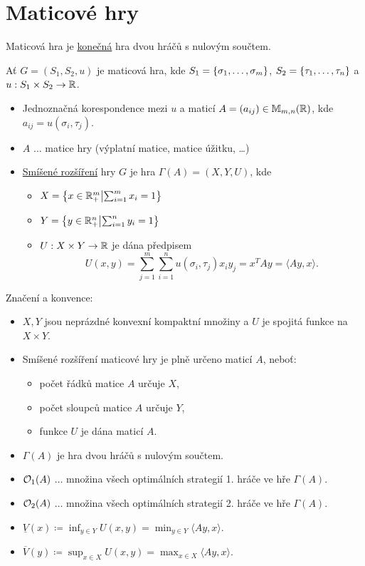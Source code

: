 \section{Maticové hry}
Maticová hra je \hyperref[konecna]{konečná} hra dvou hráčů s nulovým součtem.

Ať $G = (S_1, S_2, u)$ je maticová hra, kde $S_1 = \left\lbrace \sigma_1, \dots, \sigma_m \right\rbrace$, $S_2 = \left\lbrace \tau_1, \dots, \tau_n \right\rbrace$
a $u : S_1 \times S_2 \rightarrow \mathbb{R}$.

\begin{itemize}
    \item Jednoznačná korespondence mezi $u$ a maticí $A = (a_{ij}) \in \mathbb{M}_{m,n}(\mathbb{R})$, kde 
    $a_{ij} = u(\sigma_i, \tau_j)$.
    \item $A$ $\dots$ matice hry (výplatní matice, matice úžitku, \dots)
    \item \hyperref[smisRoz]{Smíšené rozšíření} hry $G$ je hra $\Gamma(A) = (X, Y, U)$, kde
    \begin{itemize}
        \item $X = \left\lbrace x \in \mathbb{R}_+^m \middle| \sum_{i=1}^{m} x_i=1 \right\rbrace$
        \item $Y = \left\lbrace y \in \mathbb{R}_+^n \middle| \sum_{i=1}^{n} y_i=1 \right\rbrace$
        \item $U : X \times Y \rightarrow \mathbb{R}$ je dána předpisem
        \[
            U(x,y) = \sum_{j=1}^{m}\sum_{i=1}^{n}u(\sigma_i, \tau_j)x_iy_j = x^T Ay = \langle Ay, x\rangle.
        \]
    \end{itemize}
\end{itemize}
Značení a konvence:
\begin{itemize}
    \item $X, Y$ jsou neprázdné konvexní kompaktní množiny a $U$ je spojitá funkce na $X \times Y$.
    \item Smíšené rozšíření maticové hry je plně určeno maticí $A$, neboť:
    \begin{itemize}
        \item počet řádků matice $A$ určuje $X$,
        \item počet sloupců matice $A$ určuje $Y$,
        \item funkce $U$ je dána maticí $A$.
    \end{itemize}
    \item $\Gamma(A)$ je hra dvou hráčů s nulovým součtem.
    \item $\mathcal{O}_1 (A)$ $\dots$ množina všech optimálních strategií 1. hráče ve hře $\Gamma(A)$.
    \item $\mathcal{O}_2 (A)$ $\dots$ množina všech optimálních strategií 2. hráče ve hře $\Gamma(A)$.
    \item $\underline{V}(x) \coloneq \inf_{y\in Y}U(x,y) = \min_{y\in Y} \langle Ay, x\rangle$.
    \item $\overline{V}(y)  \coloneq \sup_{x\in X}U(x,y) = \max_{x\in X} \langle Ay, x\rangle$.
\end{itemize}

